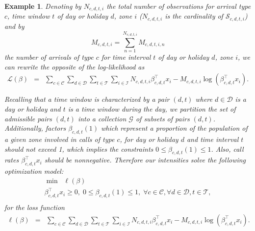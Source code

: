 \documentclass[article]{jss}
\newtheorem{example}{Example}[section]
\begin{document}
{\begin{example}
Denoting by
$N_{c,d,t,i}$ the total number of observations
for arrival type $c$, time window $t$ of day or holiday $d$, zone $i$
($N_{c,d,t,i}$ is the cardinality of 
$\mathcal{S}_{c,d,t,i}$)
and
by
$$
\displaystyle
{M}_{c,d,t,i}=
\sum_{n=1}^{N_{c,d,t,i}} M_{c,d,t,i,n}
$$
the number of arrivals of type $c$
for time interval $t$
of day or holiday $d$,
zone $i$, we can rewrite  the opposite of the log-likelihood
as
\begin{equation}\label{loglikenpen}
\begin{array}{lcl}
\mathscr{L}(\beta)&=&
\displaystyle 
\sum_{c \in \mathcal{C}}
\sum_{d \in \mathcal{D}}
\sum_{t \in \mathcal{T}}
\sum_{i \in \mathcal{I}}
N_{c,d,t,i}\beta_{c,d,t}^{\top} x_i -
M_{c,d,t,i}
\log(\beta_{c,d,t}^{\top} x_i).
\end{array}
\end{equation}

Recalling that a time window
is characterized by a pair
$(d,t)$ where
$d \in \mathcal{D}$
is a day or holiday and
$t$ is a time window during the
day, we partition the set
of admissible pairs $(d,t)$
into a collection $\mathcal{G}$
of subsets of pairs $(d,t)$.
Additionally, factors
$\beta_{c,d,t}(1)$ which represent
a proportion of the population
of a given zone involved in calls
of type $c$, for day or holiday
$d$ and time interval $t$
should not exceed 1, which implies
the constraints
$0 \leq \beta_{c,d,t}(1) \leq 1$.
Also, call rates
$\beta_{c,d,t}^{\top} x_i$ should be nonnegative. 
Therefore our intensities solve the
following optimization model:
\begin{equation}\label{model2}
\begin{array}{l}
\min \;\; \ell(\beta)\\
\beta_{c,d,t}^{\top} x_i  \geq 0,\;
0 \leq \beta_{c,d,t}(1) \leq 1,\;
\forall c \in \mathcal{C}, \forall d \in \mathcal{D}, t \in \mathcal{T},\\
\end{array}
\end{equation}
for the loss function
\begin{equation}\label{eqn:lossf}
\begin{array}{lcl}
\ell(\beta)&=&
\displaystyle 
\sum_{c \in \mathcal{C}}
\sum_{d \in \mathcal{D}}
\sum_{t \in \mathcal{T}}
\sum_{i \in \mathcal{I}}
N_{c,d,t,i}\beta_{c,d,t}^{\top} x_i -
M_{c,d,t,i}
\log(\beta_{c,d,t}^{\top} x_i).
\end{array}
\end{equation}
\fi


\end{example}}
\end{document}
